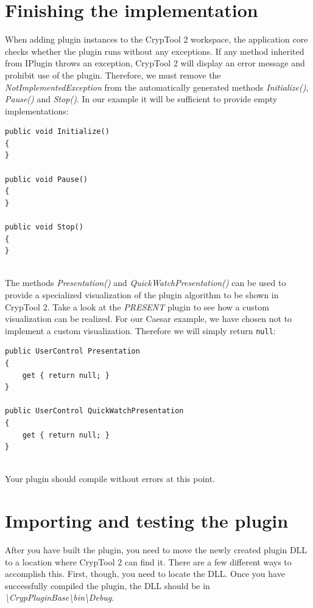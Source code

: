\section{Finishing the implementation}
\label{sec:FinishingTheImplementation}

When adding plugin instances to the CrypTool 2 workspace, the application core checks whether the plugin runs without any exceptions. If any method inherited from IPlugin throws an exception, CrypTool 2 will display an error message and prohibit use of the plugin. Therefore, we must remove the \textit{NotImplementedException} from the automatically generated methods \textit{Initialize()}, \textit{Pause()} and \textit{Stop()}. In our example it will be sufficient to provide empty implementations:

\begin{lstlisting}
public void Initialize()
{
}

public void Pause()
{
}

public void Stop()
{
}
\end{lstlisting}

\ \\
The methods \textit{Presentation()} and \textit{QuickWatchPresentation()} can be used to provide a specialized visualization of the plugin algorithm to be shown in CrypTool 2. Take a look at the \textit{PRESENT} plugin to see how a custom visualization can be realized. For our Caesar example, we have chosen not to implement a custom visualization. Therefore we will simply return \texttt{null}:

\begin{lstlisting}
public UserControl Presentation
{
	get { return null; }
}

public UserControl QuickWatchPresentation
{
	get { return null; }
}
\end{lstlisting}

\ \\
Your plugin should compile without errors at this point.
\clearpage

\section{Importing and testing the plugin}
\label{sec:ImportingAndTestingThePlugin}

After you have built the plugin, you need to move the newly created plugin DLL to a location where CrypTool 2 can find it. There are a few different ways to accomplish this. First, though, you need to locate the DLL. Once you have successfully compiled the plugin, the DLL should be in \textit{\mbox{\textbackslash CrypPluginBase\textbackslash }bin\textbackslash Debug}.

